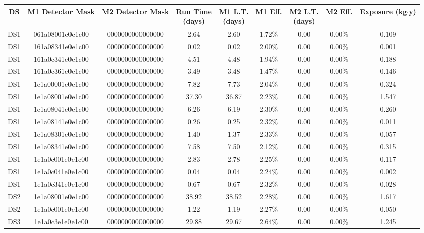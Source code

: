\begin{tabular}{|c|c c|c|c c|c c|c|}
  \hline
  DS & M1 Detector Mask & M2 Detector Mask & \makecell{Run Time\\(days)} & \makecell{M1 L.T.\\(days)} & M1 Eff. & \makecell{M2 L.T.\\(days)} & M2 Eff. & \makecell{Exposure\\(kg$\cdot$y)} \\
  \hline
  DS1 & 061a08001e0e1c00 & 0000000000000000 & 2.64 & 2.60 & 1.72\% & 0.00 & 0.00\% & 0.109 \\
  DS1 & 161a08341e0e1c00 & 0000000000000000 & 0.02 & 0.02 & 2.00\% & 0.00 & 0.00\% & 0.001 \\
  DS1 & 161a0c341e0e1c00 & 0000000000000000 & 4.51 & 4.48 & 1.94\% & 0.00 & 0.00\% & 0.188 \\
  DS1 & 161a0c361e0e1c00 & 0000000000000000 & 3.49 & 3.48 & 1.47\% & 0.00 & 0.00\% & 0.146 \\
  DS1 & 1e1a00001e0e1c00 & 0000000000000000 & 7.82 & 7.73 & 2.04\% & 0.00 & 0.00\% & 0.324 \\
  DS1 & 1e1a08001e0e1c00 & 0000000000000000 & 37.30 & 36.87 & 2.23\% & 0.00 & 0.00\% & 1.547 \\
  DS1 & 1e1a08041e0e1c00 & 0000000000000000 & 6.26 & 6.19 & 2.30\% & 0.00 & 0.00\% & 0.260 \\
  DS1 & 1e1a08141e0e1c00 & 0000000000000000 & 0.26 & 0.25 & 2.32\% & 0.00 & 0.00\% & 0.011 \\
  DS1 & 1e1a08301e0e1c00 & 0000000000000000 & 1.40 & 1.37 & 2.33\% & 0.00 & 0.00\% & 0.057 \\
  DS1 & 1e1a08341e0e1c00 & 0000000000000000 & 7.58 & 7.50 & 2.12\% & 0.00 & 0.00\% & 0.315 \\
  DS1 & 1e1a0c001e0e1c00 & 0000000000000000 & 2.83 & 2.78 & 2.25\% & 0.00 & 0.00\% & 0.117 \\
  DS1 & 1e1a0c041e0e1c00 & 0000000000000000 & 0.04 & 0.04 & 2.24\% & 0.00 & 0.00\% & 0.002 \\
  DS1 & 1e1a0c341e0e1c00 & 0000000000000000 & 0.67 & 0.67 & 2.32\% & 0.00 & 0.00\% & 0.028 \\
  DS2 & 1e1a08001e0e1c00 & 0000000000000000 & 38.92 & 38.52 & 2.28\% & 0.00 & 0.00\% & 1.617 \\
  DS2 & 1e1a0c001e0e1c00 & 0000000000000000 & 1.22 & 1.19 & 2.27\% & 0.00 & 0.00\% & 0.050 \\
  DS3 & 1e1a0c3e1e0e1c00 & 0000000000000000 & 29.88 & 29.67 & 2.64\% & 0.00 & 0.00\% & 1.245 \\

\end{tabular}
